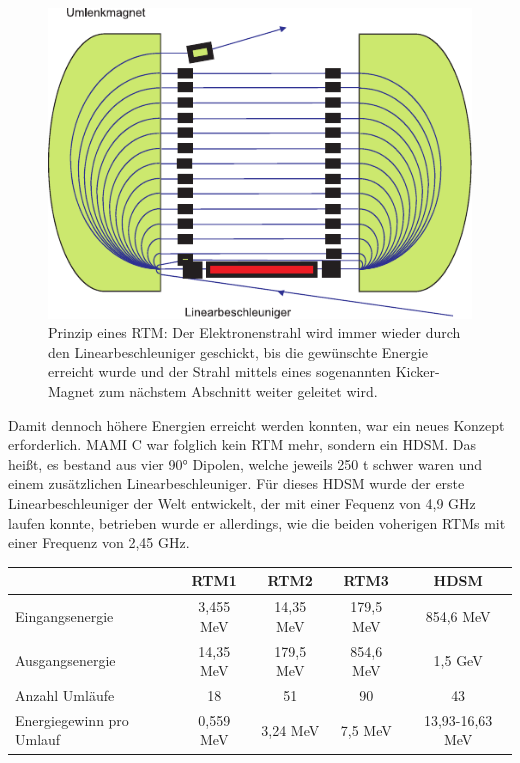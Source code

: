 \documentclass[a4paper,11pt,oneside,final,german,openbib,pdftex]{scrbook}
\begin{document}
{\begin{figure}[h!]
	\begin{center}
	\includegraphics{RTM}	
	\caption{Prinzip eines RTM: Der Elektronenstrahl wird immer wieder durch den Linearbeschleuniger geschickt, bis die gew\"unschte Energie erreicht wurde und der Strahl mittels eines sogenannten Kicker-Magnet zum n\"achstem Abschnitt weiter geleitet wird.\cite{KPh07} }
	\label{fig.RTM}
\end{center}
\end{figure}

Damit dennoch h\"ohere Energien erreicht werden konnten, war ein neues Konzept erforderlich. MAMI C war folglich kein RTM mehr, sondern ein HDSM. Das hei{\ss}t, es bestand aus vier 90° Dipolen, welche jeweils 250 t schwer waren und einem zus\"atzlichen Linearbeschleuniger. F\"ur dieses HDSM wurde der erste Linearbeschleuniger der Welt entwickelt, der mit einer Fequenz von 4,9 GHz laufen konnte, betrieben wurde er allerdings, wie die beiden voherigen RTMs mit einer Frequenz von 2,45 GHz.
\begin{table}[h!]
	\begin{center}
		\begin{tabular}{|l|c|c|c|c|}
			\hline
			& RTM1 & RTM2 & RTM3 & HDSM \\
			\hline
			\hline
			Eingangsenergie &3,455 MeV  &  14,35 MeV& 179,5 MeV  &854,6 MeV \\ \hline
			Ausgangsenergie &14,35 MeV  &  179,5 MeV &854,6 MeV  & 1,5 GeV \\ \hline
			Anzahl Uml\"aufe&18  &51  &90  &43 \\ \hline
			Energiegewinn pro Umlauf &0,559 MeV  & 3,24 MeV & 7,5 MeV  & 13,93-16,63 MeV \\ \hline
			

\end{tabular}
\end{center}
\end{table}}
\end{document}
